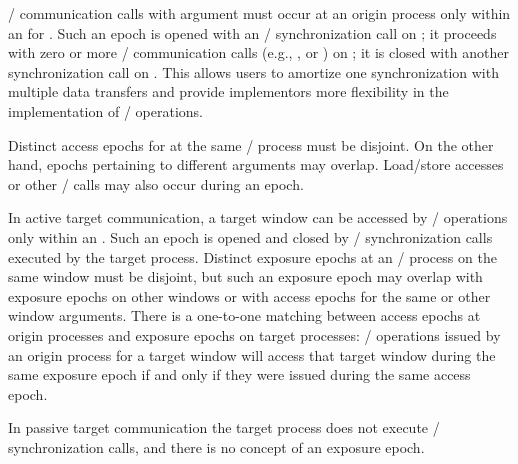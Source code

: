 \RMA/ communication calls with argument  must occur at an origin process
only within an  for .  Such an epoch
is opened with an \RMA/ synchronization
call on ; it proceeds with zero or more \RMA/
communication calls (e.g., ,  or
) on ; it is closed with another
synchronization call on 
. This allows users to amortize one synchronization with multiple data
transfers and provide implementors
more flexibility in the implementation of \RMA/ operations.

Distinct access epochs for  at the same \mpi/ process must be disjoint.
On the other hand, epochs pertaining to different  arguments
may
overlap.  Load/store accesses or other \MPI/ calls may also occur during
an epoch.

In active target communication, a target window can be accessed by \RMA/
operations only within an . Such an epoch is
opened and closed by \RMA/ synchronization calls executed by the
target process.  Distinct exposure epochs at an \mpi/ process
on the same window must be disjoint, but such an exposure epoch
may overlap with exposure epochs on other windows or
with access epochs for the same or other window arguments.
There is a one-to-one matching between access epochs at origin
processes and exposure epochs on target processes:
\RMA/ operations issued by an origin process for a target window will
access that
target window during the same exposure epoch if and only if they were
issued during the same access 
epoch.

In passive target communication the target
process does not execute \RMA/ synchronization calls, and there is no
concept of an exposure 
epoch. 

